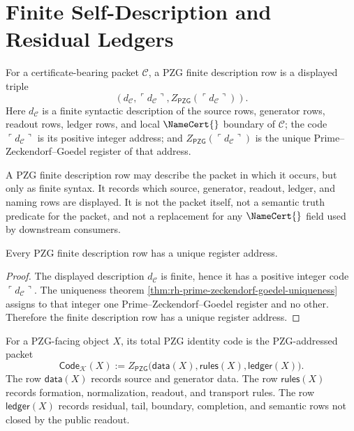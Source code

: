 \section{Finite Self-Description and Residual Ledgers}
\label{sec:rh-pzg-finite-self-description-ledgers}

\begin{definition}
\label{def:rh-pzg-finite-description-row}
For a certificate-bearing packet $\mathcal C$, a PZG finite description row is
a displayed triple
$$
(d_{\mathcal C},\ulcorner d_{\mathcal C}\urcorner,
Z_{\mathsf{PZG}}(\ulcorner d_{\mathcal C}\urcorner)).
$$
Here $d_{\mathcal C}$ is a finite syntactic description of the source rows,
generator rows, readout rows, ledger rows, and local $\NameCert{}$ boundary
of $\mathcal C$; the code $\ulcorner d_{\mathcal C}\urcorner$ is its positive
integer address; and $Z_{\mathsf{PZG}}(\ulcorner d_{\mathcal C}\urcorner)$ is
the unique Prime--Zeckendorf--Goedel register of that address.
\end{definition}

\begin{principle}
\label{prin:rh-pzg-finite-self-description-syntactic}
A PZG finite description row may describe the packet in which it occurs, but
only as finite syntax.  It records which source, generator, readout, ledger,
and naming rows are displayed.  It is not the packet itself, not a semantic
truth predicate for the packet, and not a replacement for any $\NameCert{}$
field used by downstream consumers.
\end{principle}

\begin{theorem}
\label{thm:rh-pzg-finite-descriptions-unique-addresses}
Every PZG finite description row has a unique register address.
\end{theorem}

\begin{proof}
The displayed description $d_{\mathcal C}$ is finite, hence it has a positive
integer code $\ulcorner d_{\mathcal C}\urcorner$.  The uniqueness theorem
\autoref{thm:rh-prime-zeckendorf-goedel-uniqueness} assigns to that integer
one Prime--Zeckendorf--Goedel register and no other.  Therefore the finite
description row has a unique register address.
\end{proof}

\begin{definition}
\label{def:rh-total-pzg-identity-code}
For a PZG-facing object $X$, its total PZG identity code is the
PZG-addressed packet
$$
\mathsf{Code}_{\mathcal K}(X)
:=
Z_{\mathsf{PZG}}
\bigl(
\mathsf{data}(X),\mathsf{rules}(X),\mathsf{ledger}(X)
\bigr).
$$
The row $\mathsf{data}(X)$ records source and generator data.  The row
$\mathsf{rules}(X)$ records formation, normalization, readout, and
transport rules.  The row $\mathsf{ledger}(X)$ records residual, tail,
boundary, completion, and semantic rows not closed by the public readout.
\end{definition}

